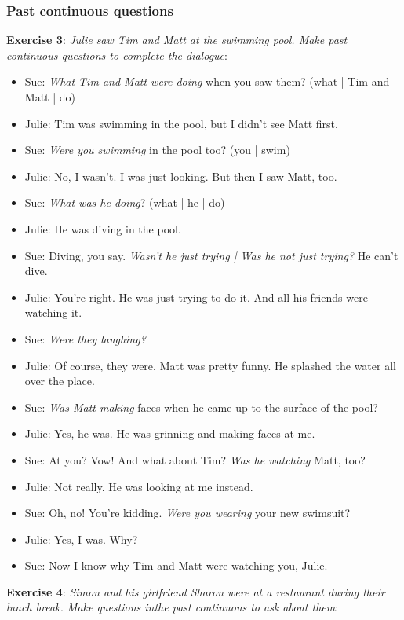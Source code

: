 \subsubsection{Past continuous questions}

\textbf{Exercise 3}: \textit{Julie saw Tim and Matt at the swimming pool. Make past continuous questions to complete the dialogue}:

\begin{itemize}

\item Sue: \textit{What Tim and Matt were doing} when you saw them? (what | Tim and Matt | do)
\item Julie: Tim was swimming in the pool, but I didn't see Matt first.
\item Sue: \textit{Were you swimming} in the pool too? (you | swim)
\item Julie: No, I wasn't. I was just looking. But then I saw Matt, too.
\item Sue: \textit{What was he doing}? (what | he | do)
\item Julie: He was diving in the pool.
\item Sue: Diving, you say. \textit{Wasn't he just trying | Was he not just trying?} He can't dive.
\item Julie: You're right. He was just trying to do it. And all his friends were watching it.
\item Sue: \textit{Were they laughing?}
\item Julie: Of course, they were. Matt was pretty funny. He splashed the water all over the place.
\item Sue: \textit{Was Matt making} faces when he came up to the surface of the pool?
\item Julie: Yes, he was. He was grinning and making faces at me.
\item Sue: At you? Vow! And what about Tim? \textit{Was he watching} Matt, too?
\item Julie: Not really. He was looking at me instead.
\item Sue: Oh, no! You're kidding. \textit{Were you wearing} your new swimsuit?
\item Julie: Yes, I was. Why?
\item Sue: Now I know why Tim and Matt were watching you, Julie.

\end{itemize}

\textbf{Exercise 4}: \textit{Simon and his girlfriend  Sharon were  at a restaurant during their lunch break. Make questions inthe past continuous to ask about them}:

